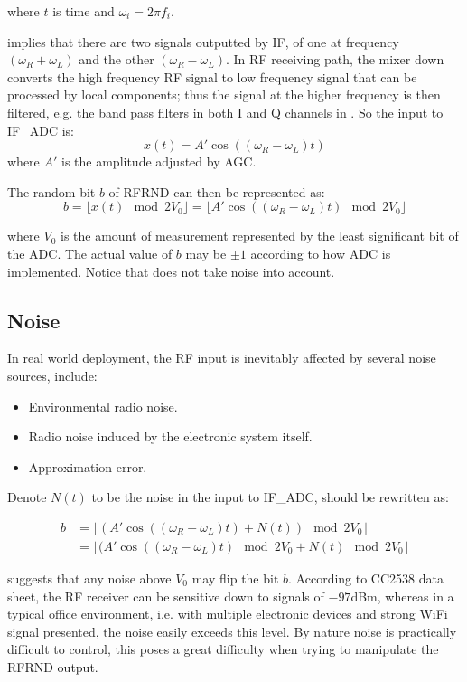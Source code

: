 where $t$ is time and $\omega_i = 2{\pi}f_i$.

 implies that there are two signals outputted by IF, of one at frequency $(\omega_{R} + \omega_{L})$ and the other $(\omega_{R} - \omega_{L})$. In RF receiving path,  the mixer down converts the high frequency RF signal to low frequency signal that can be processed by local components; thus the signal at the higher frequency is then filtered, e.g. the band pass filters in both I and Q channels in . So the input to IF\_ADC is:
\begin{equation}
x(t) = A'\cos((\omega_{R} - \omega_{L})t)
\end{equation}
where $A'$ is the amplitude adjusted by AGC. 

The random bit $b$ of RFRND can then be represented as:
\begin{equation} \label{RFRND}
b = \lfloor{x(t)} \mod 2V_0 \rfloor = \lfloor{A'\cos((\omega_{R} - \omega_{L})t) \mod 2V_0 }\rfloor
\end{equation}

where $V_0$ is the amount of measurement represented by the least significant bit of the ADC. The actual value of $b$ may be $\pm 1$ according to how ADC is implemented. Notice that  does not take noise into account.

\subsection{Noise}

In real world deployment, the RF input is inevitably affected by several noise sources, include:

\begin{itemize}
\item Environmental radio noise.
\item Radio noise induced by the electronic system itself.
\item Approximation error.
\end{itemize}

Denote $N(t)$ to be the noise in the input to IF\_ADC,  should be rewritten as:

\begin{equation} \label{RFRND_noise}
\begin{split}
b &= \lfloor{(A'\cos((\omega_{R} - \omega_{L})t) + N(t) )\mod 2V_0 }\rfloor \\
&= \lfloor{(A'\cos((\omega_{R} - \omega_{L})t) \mod 2V_0 + N(t) \mod 2V_0 }\rfloor
\end{split}
\end{equation}

 suggests that any noise above $V_0$ may flip the bit $b$. According to CC2538 data sheet\cite{CC2538_Datasheet}, the RF receiver can be sensitive down to signals of $-97$dBm, whereas in a typical office environment, i.e. with multiple electronic devices and strong WiFi signal presented, the noise easily exceeds this level. By nature noise is practically difficult to control, this poses a great difficulty when trying to manipulate the RFRND output.
